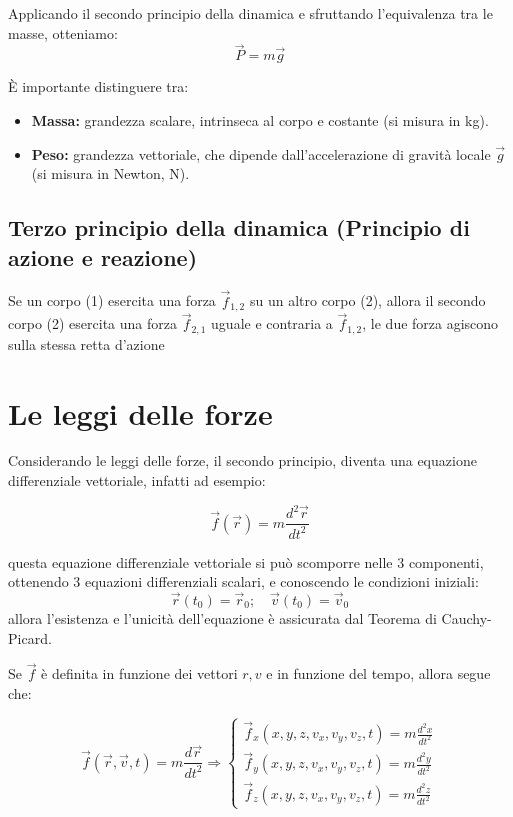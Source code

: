 \documentclass[11pt, a4paper, openright]{book}
\theoremstyle{plain}
\theoremstyle{definition}
\begin{document}
Applicando il secondo principio della dinamica e sfruttando l'equivalenza tra le masse, otteniamo:
\begin{equation}
    \vec{P} = m \vec{g}
\end{equation}

È importante distinguere tra:
\begin{itemize}
    \item \textbf{Massa:} grandezza scalare, intrinseca al corpo e costante (si misura in kg).
    \item \textbf{Peso:} grandezza vettoriale, che dipende dall'accelerazione di gravità locale $\vec{g}$ (si misura in Newton, N).
\end{itemize}

\subsection{Terzo principio della dinamica (Principio di azione e reazione)}
Se un corpo (1) esercita una forza $\vec{f}_{1,2}$ su un altro corpo (2), allora il secondo corpo (2) esercita una forza $\vec{f}_{2,1}$ uguale e contraria a $\vec{f}_{1,2}$, le due forza agiscono sulla stessa retta d'azione 

\section{Le leggi delle forze}
Considerando le leggi delle forze, il secondo principio, diventa una equazione differenziale vettoriale, infatti ad esempio:

\begin{equation*}
    \vec{f}(\vec{r}) = m \frac{d^2\vec{r}}{dt^2}
\end{equation*}

questa equazione differenziale vettoriale si può scomporre nelle 3 componenti, ottenendo 3 equazioni differenziali scalari, e conoscendo le condizioni iniziali:
\[\vec{r}(t_0) = \vec{r}_0; \quad \vec{v}(t_0) = \vec{v}_0\]
allora l'esistenza e l'unicità dell'equazione è assicurata dal Teorema di Cauchy-Picard.

Se $\vec{f}$ è definita in funzione dei vettori $r, v$ e in funzione del tempo, allora segue che:

\begin{equation*}
    \vec{f}(\vec{r}, \vec{v}, t) = m \frac{d\vec{r}}{dt^2} \Rightarrow 
    \begin{cases}
        \displaystyle \vec{f}_x(x, y, z, v_x, v_y, v_z, t) = m \frac{d^2x}{dt^2} \\
        \displaystyle \vec{f}_y(x, y, z, v_x, v_y, v_z, t) = m \frac{d^2y}{dt^2} \\
        \displaystyle \vec{f}_z(x, y, z, v_x, v_y, v_z, t) = m \frac{d^2z}{dt^2}
    \end{cases}
\end{equation*}
\end{document}
